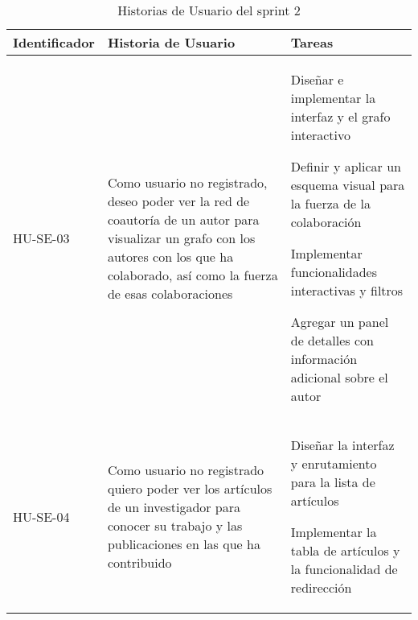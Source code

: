 \begin{table}[H]
    \centering
    \begin{tabular}{|p{2.5cm}|p{5cm}|p{6cm}|}
        \midrule
        \textbf{Identificador} & \textbf{Historia de Usuario}                                                                                                                                                                               & \textbf{Tareas} \\
        \hline
        HU-SE-03 & Como usuario no registrado, deseo poder ver la red de coautoría de un autor para visualizar un grafo con los autores con los que ha colaborado, así como la fuerza de esas colaboraciones &
        \begin{compactitem}
            \item Diseñar e implementar la interfaz y el grafo interactivo
            \item Definir y aplicar un esquema visual para la fuerza de la colaboración
            \item Implementar funcionalidades interactivas y filtros
            \item Agregar un panel de detalles con información adicional sobre el autor
        \end{compactitem}
        \\
        \hline
        HU-SE-04 & Como usuario no registrado quiero poder ver los artículos de un investigador para conocer su trabajo y las publicaciones en las que ha contribuido &
        \begin{compactitem}
            \item Diseñar la interfaz y enrutamiento para la lista de artículos
            \item Implementar la tabla de artículos y la funcionalidad de redirección
        \end{compactitem}
        \\
        \hline
        
    \end{tabular}
    \caption{Historias de Usuario del sprint 2}
    \label{C2T2:Historias de Usuario del Sprint 2}
\end{table}
